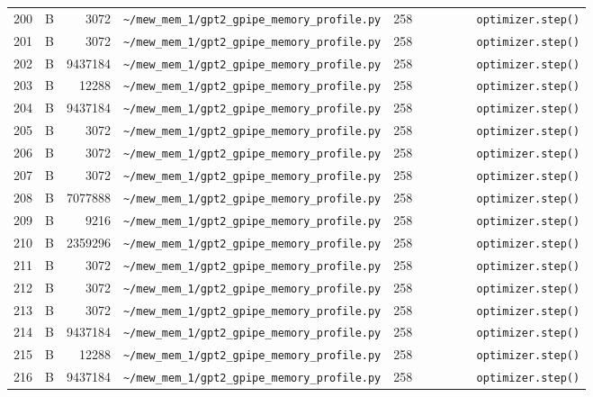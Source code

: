 \documentclass{article}
\begin{document}
\begin{longtable}{r l r p{6.5cm} r p{7.0cm}}
200 & B & 3072 & \lstinline|~/mew_mem_1/gpt2_gpipe_memory_profile.py| & 258 & \lstinline|        optimizer.step()| \\
201 & B & 3072 & \lstinline|~/mew_mem_1/gpt2_gpipe_memory_profile.py| & 258 & \lstinline|        optimizer.step()| \\
202 & B & 9437184 & \lstinline|~/mew_mem_1/gpt2_gpipe_memory_profile.py| & 258 & \lstinline|        optimizer.step()| \\
203 & B & 12288 & \lstinline|~/mew_mem_1/gpt2_gpipe_memory_profile.py| & 258 & \lstinline|        optimizer.step()| \\
204 & B & 9437184 & \lstinline|~/mew_mem_1/gpt2_gpipe_memory_profile.py| & 258 & \lstinline|        optimizer.step()| \\
205 & B & 3072 & \lstinline|~/mew_mem_1/gpt2_gpipe_memory_profile.py| & 258 & \lstinline|        optimizer.step()| \\
206 & B & 3072 & \lstinline|~/mew_mem_1/gpt2_gpipe_memory_profile.py| & 258 & \lstinline|        optimizer.step()| \\
207 & B & 3072 & \lstinline|~/mew_mem_1/gpt2_gpipe_memory_profile.py| & 258 & \lstinline|        optimizer.step()| \\
208 & B & 7077888 & \lstinline|~/mew_mem_1/gpt2_gpipe_memory_profile.py| & 258 & \lstinline|        optimizer.step()| \\
209 & B & 9216 & \lstinline|~/mew_mem_1/gpt2_gpipe_memory_profile.py| & 258 & \lstinline|        optimizer.step()| \\
210 & B & 2359296 & \lstinline|~/mew_mem_1/gpt2_gpipe_memory_profile.py| & 258 & \lstinline|        optimizer.step()| \\
211 & B & 3072 & \lstinline|~/mew_mem_1/gpt2_gpipe_memory_profile.py| & 258 & \lstinline|        optimizer.step()| \\
212 & B & 3072 & \lstinline|~/mew_mem_1/gpt2_gpipe_memory_profile.py| & 258 & \lstinline|        optimizer.step()| \\
213 & B & 3072 & \lstinline|~/mew_mem_1/gpt2_gpipe_memory_profile.py| & 258 & \lstinline|        optimizer.step()| \\
214 & B & 9437184 & \lstinline|~/mew_mem_1/gpt2_gpipe_memory_profile.py| & 258 & \lstinline|        optimizer.step()| \\
215 & B & 12288 & \lstinline|~/mew_mem_1/gpt2_gpipe_memory_profile.py| & 258 & \lstinline|        optimizer.step()| \\
216 & B & 9437184 & \lstinline|~/mew_mem_1/gpt2_gpipe_memory_profile.py| & 258 & \lstinline|        optimizer.step()| \\

\end{longtable}
\end{document}
